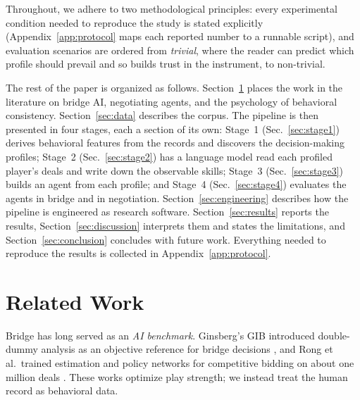 \documentclass[runningheads]{llncs}
\begin{document}
Throughout, we adhere to two methodological principles: every
experimental condition needed to reproduce the study is stated
explicitly (Appendix~\ref{app:protocol} maps each reported number to a
runnable script), and evaluation scenarios are ordered from
\emph{trivial}, where the reader can predict which profile should
prevail and so builds trust in the instrument, to non-trivial.

The rest of the paper is organized as follows.
Section~\ref{sec:related} places the work in the literature on bridge
AI, negotiating agents, and the psychology of behavioral consistency.
Section~\ref{sec:data} describes the corpus. The pipeline is then
presented in four stages, each a section of its own: Stage~1
(Sec.~\ref{sec:stage1}) derives behavioral features from the records
and discovers the decision-making profiles; Stage~2
(Sec.~\ref{sec:stage2}) has a language model read each profiled
player's deals and write down the observable skills; Stage~3
(Sec.~\ref{sec:stage3}) builds an agent from each profile; and Stage~4
(Sec.~\ref{sec:stage4}) evaluates the agents in bridge and in
negotiation. Section~\ref{sec:engineering} describes how the pipeline
is engineered as research software. Section~\ref{sec:results} reports
the results, Section~\ref{sec:discussion} interprets them and states
the limitations, and Section~\ref{sec:conclusion} concludes with future
work. Everything needed to reproduce the results is collected in
Appendix~\ref{app:protocol}.

\section{Related Work}\label{sec:related}

Bridge has long served as an \emph{AI benchmark}. Ginsberg's GIB
introduced double-dummy analysis as an objective reference for bridge
decisions \cite{ginsberg2001gib}, and Rong et al.\ trained estimation
and policy networks for competitive bidding on about one million deals
\cite{rong2019bridge}. These works optimize play strength; we instead
treat the human record as behavioral data.
\end{document}
